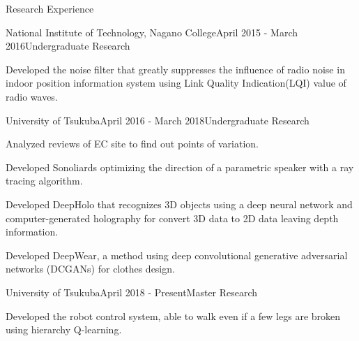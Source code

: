 \documentclass{resume} %
\begin{document}
\begin{rSection}{Research Experience}

    \begin{rSubsection}{National Institute of Technology, Nagano College}{April 2015 - March 2016}{Undergraduate Research}{}
    \item Developed the noise filter that greatly suppresses the influence of radio noise in indoor position information system using Link Quality Indication(LQI) value of radio waves.
    \end{rSubsection}

    \begin{rSubsection}{University of Tsukuba}{April 2016 - March 2018}{Undergraduate Research}{}
    \item Analyzed reviews of EC site to find out points of variation.
    \item Developed Sonoliards optimizing the direction of a parametric speaker with a ray tracing algorithm.
    \item Developed DeepHolo that recognizes 3D objects using a deep neural network and computer-generated holography for convert 3D data to 2D data leaving depth information.
    \item Developed DeepWear, a method using deep convolutional generative adversarial networks (DCGANs) for clothes design.
    \end{rSubsection}

    \begin{rSubsection}{University of Tsukuba}{April 2018 - Present}{Master Research}{}
    \item Developed the robot control system, able to walk even if a few legs are broken using hierarchy Q-learning.
    \end{rSubsection}


\end{rSection}
\end{document}
